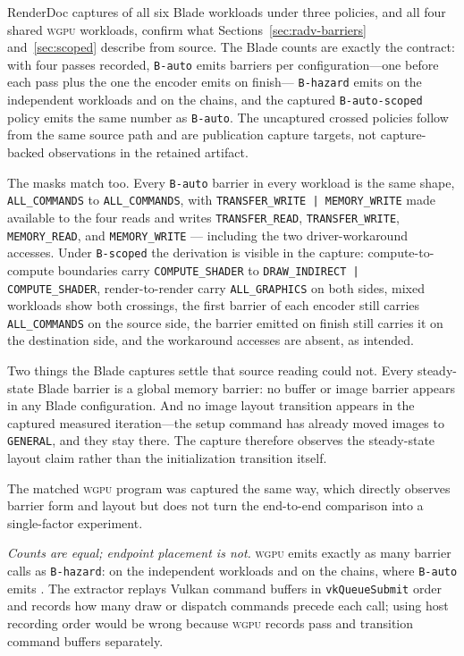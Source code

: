 \documentclass[10pt,twocolumn]{article}
\newcommand{\wgpu}{\textsc{wgpu}}
\begin{document}
RenderDoc captures of all six Blade workloads under three policies, and all
four shared \wgpu{} workloads, confirm what
Sections~\ref{sec:radv-barriers} and~\ref{sec:scoped} describe from source. The
Blade counts are exactly the contract: with four passes recorded,
\texttt{B-auto} emits  barriers per
configuration---one before each pass plus the one the encoder emits on
finish---
\texttt{B-hazard} emits  on the
independent workloads and  on the chains, and
the captured \texttt{B-auto-scoped} policy emits the same number as
\texttt{B-auto}. The uncaptured crossed policies follow from the same source
path and are publication capture targets, not capture-backed observations in
the retained artifact.

The masks match too. Every \texttt{B-auto} barrier in every workload is the
same shape, \texttt{ALL\_COMMANDS} to \texttt{ALL\_COMMANDS}, with
\texttt{TRANSFER\_WRITE\,|\,MEMORY\_WRITE} made available to the four reads and
writes \texttt{TRANSFER\_READ}, \texttt{TRANSFER\_WRITE},
\texttt{MEMORY\_READ}, and \texttt{MEMORY\_WRITE} ---
including the two driver-workaround accesses. Under \texttt{B-scoped} the
derivation is visible in the capture: compute-to-compute boundaries carry
\texttt{COMPUTE\_SHADER} to \texttt{DRAW\_INDIRECT\,|\,COMPUTE\_SHADER},
render-to-render carry \texttt{ALL\_GRAPHICS} on both sides, mixed workloads
show both crossings, the first barrier of each encoder still carries
\texttt{ALL\_COMMANDS} on the source side, the barrier emitted on finish still
carries it on the destination side, and the workaround accesses are absent, as
intended.

Two things the Blade captures settle that source reading could not. Every
steady-state Blade barrier is a global memory barrier: no buffer or image
barrier appears in any Blade configuration. And no image layout transition
appears in the captured measured iteration---the setup command has already
moved images to \texttt{GENERAL}, and they stay there. The capture therefore
observes the steady-state layout claim rather than the initialization
transition itself.

The matched \wgpu{} program was captured the same way, which directly observes
barrier form and layout but does not turn the end-to-end comparison into a
single-factor experiment.

\emph{Counts are equal; endpoint placement is not.} \wgpu{} emits exactly as
many barrier calls as \texttt{B-hazard}:
 on the independent workloads and
 on the chains, where \texttt{B-auto} emits
. The extractor replays Vulkan command
buffers in \texttt{vkQueueSubmit} order and records how many draw or dispatch
commands precede each call; using host recording order would be wrong because
\wgpu{} records pass and transition command buffers separately.
\end{document}
